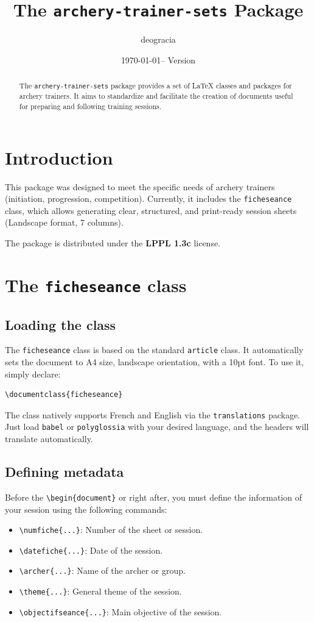\documentclass[a4paper,11pt]{article}
\title{\textbf{The \texttt{archery-trainer-sets} Package}}
\author{deogracia}
\date{\today \quad -- \quad Version \pkgversion}
\begin{document}
\maketitle

\begin{abstract}
The \texttt{archery-trainer-sets} package provides a set of \LaTeX{} classes and packages for archery trainers. It aims to standardize and facilitate the creation of documents useful for preparing and following training sessions.
\end{abstract}

\tableofcontents
\vspace{1cm}

\section{Introduction}
This package was designed to meet the specific needs of archery trainers (initiation, progression, competition). Currently, it includes the \texttt{ficheseance} class, which allows generating clear, structured, and print-ready session sheets (Landscape format, 7 columns).

The package is distributed under the \textbf{LPPL 1.3c} license.

\section{The \texttt{ficheseance} class}

\subsection{Loading the class}
The \texttt{ficheseance} class is based on the standard \texttt{article} class. It automatically sets the document to A4 size, landscape orientation, with a 10pt font.
To use it, simply declare:
\begin{lstlisting}
\documentclass{ficheseance}
\end{lstlisting}

The class natively supports French and English via the \texttt{translations} package. Just load \texttt{babel} or \texttt{polyglossia} with your desired language, and the headers will translate automatically.

\subsection{Defining metadata}
Before the \verb|\begin{document}| or right after, you must define the information of your session using the following commands:
\begin{itemize}
    \item \verb|\numfiche{...}|: Number of the sheet or session.
    \item \verb|\datefiche{...}|: Date of the session.
    \item \verb|\archer{...}|: Name of the archer or group.
    \item \verb|\theme{...}|: General theme of the session.
    \item \verb|\objectifseance{...}|: Main objective of the session.
\end{itemize}
\end{document}
